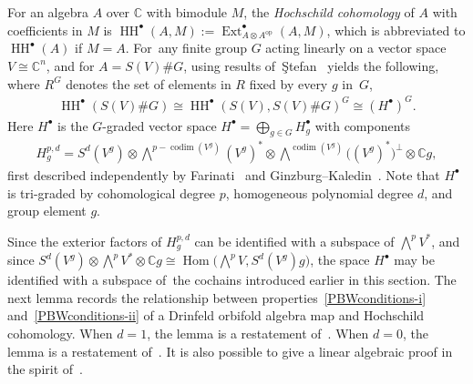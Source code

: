 \documentclass[pdftex]{sigma}
\numberwithin{equation}{section}
\newcommand{\standout}[1]{\textit{#1}} %
\newcommand{\HHSSG}[1]{\HH^{#1}(S(V),S(V)\#G)}
\DeclareMathOperator{\HH}{HH}
\DeclareMathOperator{\Ext}{Ext}
\DeclareMathOperator{\Hom}{Hom}
\DeclareMathOperator{\codim}{codim}
\begin{document}
For an algebra $A$ over $\mathbb{C}$ with bimodule $M$,
the \standout{Hochschild cohomology} of $A$ with coefficients in $M$ is
$\HH^{\bullet}(A,M):=\Ext_{A\otimes A^{\text{op}}}^{\bullet}(A,M)$, which is
abbreviated to $\HH^{\bullet}(A)$ if $M=A$. For~any finite group $G$ acting linearly on a
vector space $V \cong \mathbb{C}^n$, and for $A=S(V)\# G$,
using results of~\c{S}te\-fan~\cite{Stefan} yields the following,
where $R^G$ denotes the set of elements in $R$ fixed by every $g$ in~$G$,
\begin{gather*}
\HH^{\bullet}(S(V)\#G) \cong\HHSSG{\bullet}^G \cong (H^{\bullet})^G.
\end{gather*}
Here $H^{\bullet}$ is the $G$-graded vector space
$H^{\bullet}=\bigoplus_{g\in G}H^{\bullet}_g$
with components
\begin{gather*}
H^{p,d}_g=S^d(V^{g}) \otimes\bigwedge^{p-\codim(V^g)}(V^g)^{*} \otimes
\bigwedge^{\codim(V^g)}\bigl((V^g)^*\bigr)^{\perp} \otimes
\mathbb{C}g,
\end{gather*}
first described independently by Farinati~\cite{Farinati} and
Ginzburg--Kaledin~\cite{GinzburgKaledin}.
Note that $H^{\bullet}$ is tri-graded by cohomological degree $p$,
homogeneous polynomial degree $d$, and group element $g$.

Since the exterior factors of $H_g^{p,d}$ can be identified
with a subspace of $\bigwedge^pV^*$, and since
$S^d(V^g)\otimes\bigwedge^pV^*\otimes\mathbb{C} g\cong\Hom\big(\bigwedge^p V,S^d(V^g)g\big)$,
the space $H^{\bullet}$ may be identified with a subspace of~the
cochains introduced earlier in this section. The next lemma
records the relationship bet\-ween properties~\eqref{PBWconditions-i}
and~\eqref{PBWconditions-ii} of a Drinfeld orbifold algebra map and Hochschild cohomology.
When $d=1$, the lemma is a restatement of~\cite[Theorem~7.2(i) and (ii)]{SWorbifold}.
When $d=0$, the lemma is a restatement of~\cite[Corollary 8.17(ii)]{SheplerWitherspoon08}.
It is also possible to give a linear algebraic proof %
in the spirit of~\cite[Lemma~1.8]{RamShepler}.
\end{document}
